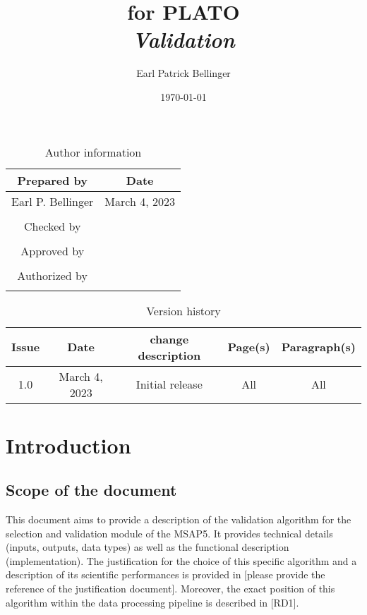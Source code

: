 \documentclass[a4paper, oneside, 11pt, article, english]{memoir}
\author{Earl Patrick Bellinger}
\title{\shorttitle{} for PLATO \\ \Large\textit{Validation}}
\date{\today}
\begin{document}
\maketitle

\begin{table}[htbp]
  \centering
  \caption{Author information}
  \label{tab:author}
  \begin{tabular}{cc}
    \toprule
    Prepared by & Date\\
    \midrule
    Earl P. Bellinger & March 4, 2023 \\
    \\
    Checked by \\
    \midrule
    \\
    Approved by \\
    \midrule
    \\
    Authorized by \\
    \midrule
    \\
    \bottomrule
  \end{tabular}
\end{table}

\begin{table}[htbp]
  \centering
  \caption{Version history}
  \label{tab:version}
  \begin{tabular}{ccccc}
    \toprule
    Issue & Date & \textnumero{} change description & Page(s) & Paragraph(s) \\
    \midrule
    1.0 & March 4, 2023 & Initial release & All & All \\
    \bottomrule
  \end{tabular}
\end{table}


\clearpage
\tableofcontents*
\clearpage


\chapter{Introduction}
\label{chap:intro}

\section{Scope of the document}
\label{sec:scope}

This document aims to provide a description of the validation algorithm for the selection and validation module of the MSAP5. 
It provides technical details (inputs, outputs, data types) as well as the
functional description (implementation). The
justification for the choice of this specific algorithm and a description of its
scientific performances is provided in [please provide the reference of the
justification document]. Moreover, the exact position of this algorithm within
the data processing pipeline is described in [RD1]. 
\end{document}
